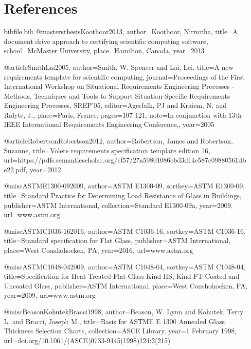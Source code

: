 \documentclass[12pt]{article}
\begin{document}
\section{References}
\label{Sec:Refe}
\begin{filecontents*}{bibfile.bib}
@mastersthesis{Koothoor2013,
author={Koothoor, Nirmitha},
title={A document drive approach to certifying scientific computing software},
school={McMaster University},
place={Hamilton, Canada},
year={2013}}

@article{SmithLai2005,
author={Smith, W. Spencer and Lai, Lei},
title={A new requirements template for scientific computing},
journal={Proceedings of the First International Workshop on Situational Requirements Engineering Processes - Methods, Techniques and Tools to Support Situation-Specific Requirements Engineering Processes, SREP'05},
editor={Agerfalk, PJ and Kraiem, N. and Ralyte, J.},
place={Paris, France},
pages={107-121},
note={In conjunction with 13th IEEE International Requirements Engineering Conference,},
year={2005}}

@article{RobertsonRobertson2012,
author={Robertson, James and Robertson, Suzanne},
title={Volere requirements specification template edition 16},
url={https://pdfs.semanticscholar.org/cf57/27a59801086cbd3d14e587e09880561dbe22.pdf},
year={2012}}

@misc{ASTME1300-092009,
author={ASTM E1300-09},
sortkey={ASTM E1300-09},
title={Standard Practice for Determining Load Resistance of Glass in Buildings},
publisher={ASTM International},
collection={Standard E1300-09a},
year={2009},
url={www.astm.org}}

@misc{ASTMC1036-162016,
author={ASTM C1036-16},
sortkey={ASTM C1036-16},
title={Standard specification for Flat Glass},
publisher={ASTM International},
place={West Conshohocken, PA},
year={2016},
url={www.astm.org}}

@misc{ASTMC1048-042009,
author={ASTM C1048-04},
sortkey={ASTM C1048-04},
title={Specification for Heat-Treated Flat Glass-Kind HS, Kind FT Coated and Uncoated Glass},
publisher={ASTM International},
place={West Conshohocken, PA},
year={2009},
url={www.astm.org}}

@misc{BeasonKohutekBracci1998,
author={Beason, W. Lynn and Kohutek, Terry L. and Bracci, Joseph M.},
title={Basis for ASTME E 1300 Annealed Glass Thickness Selection Charts},
collection={ASCE Library},
year={1 February 1998},
url={doi.org/10.1061/(ASCE)0733-9445(1998)124:2(215)}}
\end{filecontents*}
\nocite{*}
\printbibliography[heading=none]
\end{document}
